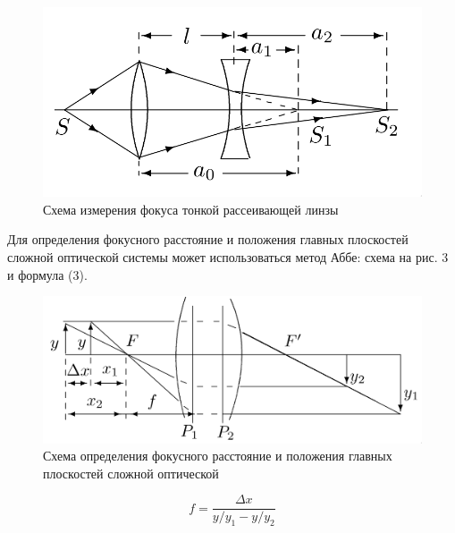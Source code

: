 \documentclass[a4paper,12pt]{article}
\begin{document}
\begin{figure}[H]
    \centering
    \includegraphics[scale=0.35]{pic_2.png}
    \caption{Схема измерения фокуса тонкой рассеивающей линзы}
\end{figure}

\noindent
Для определения фокусного расстояние и положения главных плоскостей сложной оптической системы может использоваться метод Аббе: схема на рис. 3 и формула (3).

\begin{figure}[H]
    \centering
    \includegraphics[scale=0.3]{pic_3.png}
    \caption{Схема определения фокусного расстояние и положения главных плоскостей сложной оптической}
\end{figure}

\begin{equation}
    f = \frac{\Delta x}{y / y_1 - y / y_2}    
\end{equation}
\end{document}
